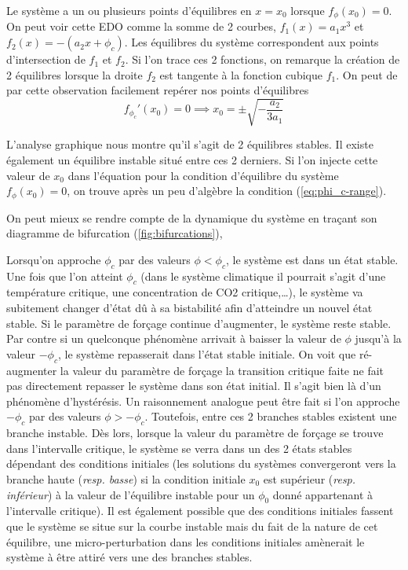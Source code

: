 Le système a un ou plusieurs points d'équilibres en $x = x_0$ lorsque $f_{\phi}(x_0) = 0$. On peut voir cette EDO comme la somme de 2 courbes, $f_1(x) = a_1 x^3$ et $f_2(x) = - (a_2x + \phi_c)$. Les équilibres du système correspondent aux points d'intersection de $f_1$ et $f_2$. Si l'on trace ces 2 fonctions, on remarque la création de 2 équilibres lorsque la droite $f_2$ est tangente à la fonction cubique $f_1$. On peut de par cette observation facilement repérer nos points d'équilibres
\begin{equation}
  f_{\phi_c}'(x_0) = 0 \implies x_0 = \pm \sqrt{-\frac{a_2}{3a_1}}
\end{equation}

L'analyse graphique nous montre qu'il s'agit de 2 équilibres stables. Il existe également un équilibre instable situé entre ces 2 derniers.
Si l'on injecte cette valeur de $x_0$ dans l'équation pour la condition d'équilibre du système $f_{\phi}(x_0) = 0$, on trouve après un peu d'algèbre la condition (\ref{eq:phi_c-range}).


On peut mieux se rendre compte de la dynamique du système en traçant son diagramme de bifurcation (\ref{fig:bifurcations}),

Lorsqu'on approche $\phi_c$ par des valeurs $\phi < \phi_c$, le système est dans un état stable. Une fois que l'on atteint $\phi_c$ (dans le système climatique il pourrait s'agit d'une température critique, une concentration de CO2 critique,\dots), le système va subitement changer d'état dû à sa bistabilité afin d'atteindre un nouvel état stable. Si le paramètre de forçage continue d'augmenter, le système reste stable. Par contre si un quelconque phénomène arrivait à baisser la valeur de $\phi$ jusqu'à la valeur $-\phi_c$, le système repasserait dans l'état stable initiale. On voit que ré-augmenter la valeur du paramètre de forçage la transition critique faite ne fait pas directement repasser le système dans son état initial. Il s'agit bien là d'un phénomène d'hystérésis. Un raisonnement analogue peut être fait si l'on approche $-\phi_c$ par des valeurs $\phi > -\phi_c$. Toutefois, entre ces 2 branches stables existent une branche instable. Dès lors, lorsque la valeur du paramètre de forçage se trouve dans l'intervalle critique, le système se verra dans un des 2 états stables dépendant des conditions initiales (les solutions du systèmes convergeront vers la branche haute (\emph{resp. basse}) si la condition initiale $x_0$ est supérieur (\emph{resp. inférieur}) à la valeur de l'équilibre instable pour un $\phi_0$ donné appartenant à l'intervalle critique). Il est également possible que des conditions initiales fassent que le système se situe sur la courbe instable mais du fait de la nature de cet équilibre, une micro-perturbation dans les conditions initiales amènerait le système à être attiré vers une des branches stables.

